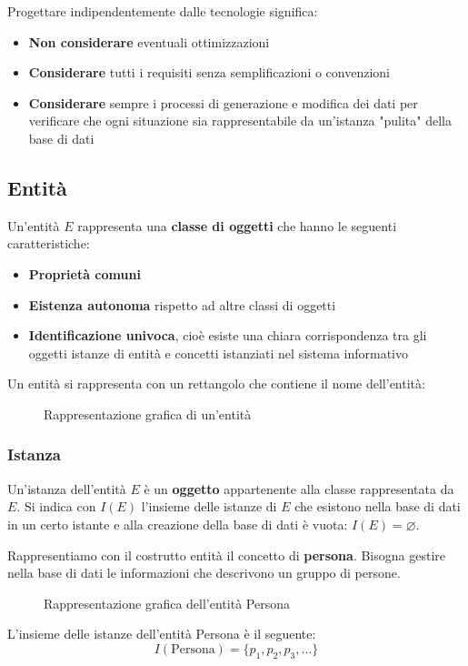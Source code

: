\documentclass[a4paper,twoside]{article}
\begin{document}
\vspace{1em}
\noindent
Progettare indipendentemente dalle tecnologie significa:
\begin{itemize}
  \item \textbf{Non considerare} eventuali ottimizzazioni
  \item \textbf{Considerare} tutti i requisiti senza semplificazioni o convenzioni
  \item \textbf{Considerare} sempre i processi di generazione e modifica dei dati
    per verificare che ogni situazione sia rappresentabile da un'istanza "pulita"
    della base di dati
\end{itemize}

\subsection{Entità}
Un'entità \( E \) rappresenta una \textbf{classe di oggetti} che hanno le seguenti
caratteristiche:
\begin{itemize}
  \item \textbf{Proprietà comuni}
  \item \textbf{Eistenza autonoma} rispetto ad altre classi di oggetti
  \item \textbf{Identificazione univoca}, cioè esiste una chiara corrispondenza tra
    gli oggetti istanze di entità e concetti istanziati nel sistema informativo
\end{itemize}
Un entità si rappresenta con un rettangolo che contiene il nome dell'entità:
\begin{figure}[H]
  \centering
  \caption{Rappresentazione grafica di un'entità}
\end{figure}

\subsubsection{Istanza}
Un'istanza dell'entità \( E \) è un \textbf{oggetto} appartenente alla classe rappresentata
da \( E \). Si indica con \( I(E) \) l'insieme delle istanze di \( E \) che esistono
nella base di dati in un certo istante e alla creazione della base di dati è vuota:
\( I(E) = \varnothing \).

\begin{example}
  Rappresentiamo con il costrutto entità il concetto di \textbf{persona}. Bisogna gestire
  nella base di dati le informazioni che descrivono un gruppo di persone.
  \begin{figure}[H]
    \centering
    \caption{Rappresentazione grafica dell'entità Persona}
  \end{figure}
  L'insieme delle istanze dell'entità Persona è il seguente:
  \[
    I(\text{Persona}) = \{p_1, p_2, p_3, \ldots\}
  \]
\end{example}
\end{document}
